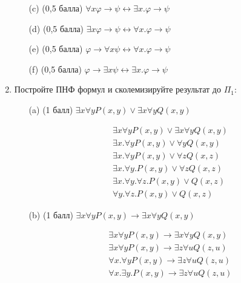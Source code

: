 \begin{enumerate}
\begin{itemize}
        \item[(c)] (0,5 балла) $\forall x\varphi \rightarrow \psi \leftrightarrow \exists x. \varphi \rightarrow \psi$
        \item[(d)] (0,5 балла) $\exists x\varphi \rightarrow \psi \leftrightarrow \forall x. \varphi \rightarrow \psi$
        \item[(e)] (0,5 балла) $\varphi \rightarrow \forall x\psi \leftrightarrow \forall x. \varphi \rightarrow \psi$
        \item[(f)] (0,5 балла) $\varphi \rightarrow \exists x\psi \leftrightarrow \exists x. \varphi \rightarrow \psi$
    \end{itemize}
    \item Постройте ПНФ формул и сколемизируйте результат до $\Pi_1$:
    \begin{itemize}
        \item[(a)] (1 балл) $\exists x\forall y P(x, y) \lor \exists x\forall y Q(x, y)$
        \begin{solution}
            \begin{align*}
                &\exists x\forall y P(x, y) \lor \exists x\forall y Q(x, y) \\
                &\exists x . \forall y P(x, y) \lor \forall y Q(x, y) \\
                &\exists x . \forall y P(x, y) \lor \forall z Q(x, z) \\
                &\exists x . \forall y. P(x, y) \lor \forall z Q(x, z) \\
                &\exists x . \forall y. \forall z . P(x, y) \lor Q(x, z) \\
                &\forall y. \forall z . P(x, y) \lor Q(x, z)
            \end{align*}
        \end{solution}
        \item[(b)] (1 балл) $\exists x\forall y P(x, y) \rightarrow \exists x\forall y Q(x, y)$
        \begin{solution}
            \begin{align*}
                &\exists x\forall y P(x, y) \rightarrow \exists x\forall y Q(x, y) \\
                &\exists x\forall y P(x, y) \rightarrow \exists z\forall u Q(z, u) \\
                &\forall x . \forall y P(x, y) \rightarrow \exists z\forall u Q(z, u) \\
                &\forall x . \exists y . P(x, y) \rightarrow \exists z\forall u Q(z, u) \\

\end{align*}
\end{solution}
\end{itemize}
\end{enumerate}
